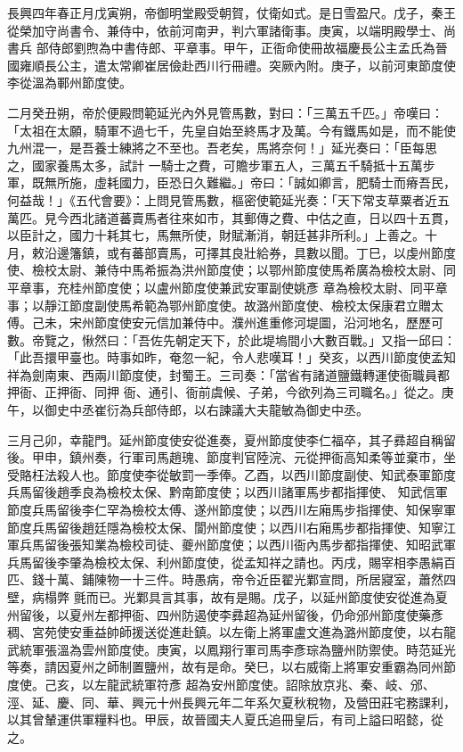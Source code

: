 
\begin{pinyinscope}

 長興四年春正月戊寅朔，帝御明堂殿受朝賀，仗衛如式。是日雪盈尺。戊子，秦王從榮加守尚書令、兼侍中，依前河南尹，判六軍諸衛事。庚寅，以端明殿學士、尚書兵
 部侍郎劉煦為中書侍郎、平章事。甲午，正衙命使冊故福慶長公主孟氏為晉國雍順長公主，遣太常卿崔居儉赴西川行冊禮。突厥內附。庚子，以前河東節度使李從溫為鄆州節度使。



 二月癸丑朔，帝於便殿問範延光內外見管馬數，對曰：「三萬五千匹。」帝嘆曰：「太祖在太願，騎軍不過七千，先皇自始至終馬才及萬。今有鐵馬如是，而不能使九州混一，是吾養士練將之不至也。吾老矣，馬將奈何！」延光奏曰：「臣每思之，國家養馬太多，試計
 一騎士之費，可贍步軍五人，三萬五千騎抵十五萬步軍，既無所施，虛耗國力，臣恐日久難繼。」帝曰：「誠如卿言，肥騎士而瘠吾民，何益哉！」《五代會要》：上問見管馬數，樞密使範延光奏：「天下常支草粟者近五萬匹。見今西北諸道蕃賣馬者往來如市，其郵傳之費、中估之直，日以四十五貫，以臣計之，國力十耗其七，馬無所使，財賦漸消，朝廷甚非所利。」上善之。十月，敕沿邊籓鎮，或有蕃部賣馬，可擇其良壯給券，具數以聞。丁巳，以虔州節度使、檢校太尉、兼侍中馬希振為洪州節度使；以鄂州節度使馬希廣為檢校太尉、同平章事，充桂州節度使；以盧州節度使兼武安軍副使姚彥
 章為檢校太尉、同平章事；以靜江節度副使馬希範為鄂州節度使。故潞州節度使、檢校太保康君立贈太傅。己未，宋州節度使安元信加兼侍中。濮州進重修河堤圖，沿河地名，歷歷可數。帝覽之，愀然曰：「吾佐先朝定天下，於此堤塢間小大數百戰。」又指一邱曰：「此吾擐甲臺也。時事如昨，奄忽一紀，令人悲嘆耳！」癸亥，以西川節度使孟知祥為劍南東、西兩川節度使，封蜀王。三司奏：「當省有諸道鹽鐵轉運使衙職員都押衙、正押衙、同押
 衙、通引、衙前虞候、子弟，今欲列為三司職名。」從之。庚午，以御史中丞崔衍為兵部侍郎，以右諫議大夫龍敏為御史中丞。



 三月己卯，幸龍門。延州節度使安從進奏，夏州節度使李仁福卒，其子彞超自稱留後。甲申，鎮州奏，行軍司馬趙瑰、節度判官陸浣、元從押衙高知柔等並棄市，坐受賂枉法殺人也。節度使李從敏罰一季俸。乙酉，以西川節度副使、知武泰軍節度兵馬留後趙季良為檢校太保、黔南節度使；以西川諸軍馬步都指揮使、
 知武信軍節度兵馬留後李仁罕為檢校太傅、遂州節度使；以西川左廂馬步指揮使、知保寧軍節度兵馬留後趙廷隱為檢校太保、閬州節度使；以西川右廂馬步都指揮使、知寧江軍兵馬留後張知業為檢校司徒、夔州節度使；以西川衙內馬步都指揮使、知昭武軍兵馬留後李肇為檢校太保、利州節度使，從孟知祥之請也。丙戌，賜宰相李愚絹百匹、錢十萬、鋪陳物一十三件。時愚病，帝令近臣翟光鄴宣問，所居寢室，蕭然四壁，病榻弊
 氈而已。光鄴具言其事，故有是賜。戊子，以延州節度使安從進為夏州留後，以夏州左都押衙、四州防遏使李彞超為延州留後，仍命邠州節度使藥彥稠、宮苑使安重益帥師援送從進赴鎮。以左衛上將軍盧文進為潞州節度使，以右龍武統軍張溫為雲州節度使。庚寅，以鳳翔行軍司馬李彥琮為鹽州防禦使。時范延光等奏，請因夏州之師制置鹽州，故有是命。癸巳，以右威衛上將軍安重霸為同州節度使。己亥，以左龍武統軍符彥
 超為安州節度使。詔除放京兆、秦、岐、邠、涇、延、慶、同、華、興元十州長興元年二年系欠夏秋稅物，及營田莊宅務課利，以其曾輦運供軍糧料也。甲辰，故晉國夫人夏氏追冊皇后，有司上謚曰昭懿，從之。




\end{pinyinscope}
